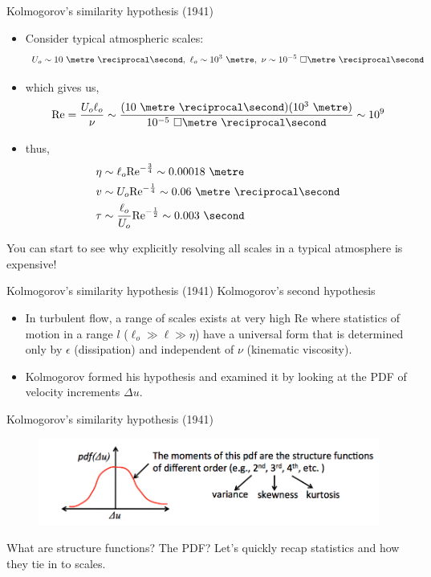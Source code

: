 
\begin{frame}{Kolmogorov's similarity hypothesis (1941)}
\begin{itemize}
	\item Consider typical atmospheric scales:$$U_o\sim10\ \metre\ \reciprocal\second,\ \ell_o\sim10^3\ \metre,\ \nu \sim 10^{-5}\ \square\metre\ \reciprocal\second$$
	\item which gives us, $$\text{Re} = \frac{U_o \ell_o}{\nu} \sim \frac{(10\ \metre\ \reciprocal\second)(10^3\ \metre)}{10^{-5}\ \square\metre\ \reciprocal\second} \sim 10^9$$
	\item thus, 
	\begin{align*}
		\eta &\sim \ell_o \text{Re}^{-\frac{3}{4}} \sim 0.00018\ \metre \\
		v &\sim U_o \text{Re}^{-\frac{1}{4}} \sim 0.06\ \metre\ \reciprocal\second \\
		\tau &\sim \frac{\ell_o}{U_o} \text{Re}^{-\frac{1}{2}} \sim 0.003\ \second
	\end{align*}
\end{itemize}
You can start to see why explicitly resolving all scales in a typical atmosphere is expensive!
\end{frame}


\begin{frame}{Kolmogorov's similarity hypothesis (1941)}
	Kolmogorov's second hypothesis
	\begin{itemize}
		\item In turbulent flow, a range of scales exists at very high Re where statistics of motion in a range $l$ ($\ell_o \gg \ell \gg \eta$) have a universal form that is determined only by $\epsilon$ (dissipation) and independent of $\nu$ (kinematic viscosity).
		\item Kolmogorov formed his hypothesis and examined it by looking at the PDF of velocity increments $\Delta u$.
	\end{itemize}
\end{frame}

\begin{frame}{Kolmogorov's similarity hypothesis (1941)}
\begin{figure}
	\includegraphics[width=1\textwidth]{pdf.png}
\end{figure}
What are structure functions? The PDF? Let's quickly recap statistics and how they tie in to scales.
\end{frame}



